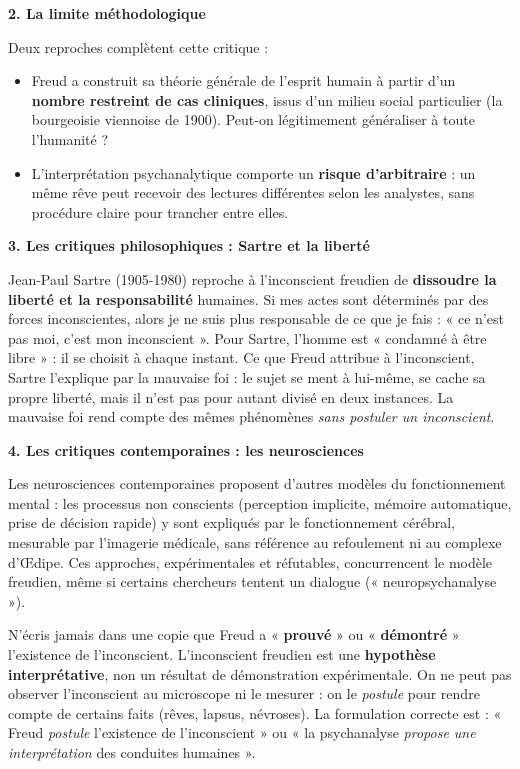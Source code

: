 \documentclass[11pt]{article}
\newcommand{\cle}[1]{{\popxbold\color{popdark}#1}}
\begin{document}
\textbf{2. La limite méthodologique}\par

Deux reproches complètent cette critique :
\begin{itemize}
\item Freud a construit sa théorie générale de l'esprit humain à partir d'un \textbf{nombre restreint de cas cliniques}, issus d'un milieu social particulier (la bourgeoisie viennoise de 1900). Peut-on légitimement généraliser à toute l'humanité ?
\item L'interprétation psychanalytique comporte un \textbf{risque d'arbitraire} : un même rêve peut recevoir des lectures différentes selon les analystes, sans procédure claire pour trancher entre elles.
\end{itemize}

\textbf{3. Les critiques philosophiques : Sartre et la liberté}\par

Jean-Paul \cle{Sartre} (1905-1980) reproche à l'inconscient freudien de \textbf{dissoudre la liberté et la responsabilité} humaines. Si mes actes sont déterminés par des forces inconscientes, alors je ne suis plus responsable de ce que je fais : « ce n'est pas moi, c'est mon inconscient ». Pour Sartre, l'homme est « condamné à être libre » : il se choisit à chaque instant. Ce que Freud attribue à l'inconscient, Sartre l'explique par la \cle{mauvaise foi} : le sujet se ment à lui-même, se cache sa propre liberté, mais il n'est pas pour autant divisé en deux instances. La mauvaise foi rend compte des mêmes phénomènes \emph{sans postuler un inconscient}.

\textbf{4. Les critiques contemporaines : les neurosciences}\par

Les \cle{neurosciences} contemporaines proposent d'autres modèles du fonctionnement mental : les processus non conscients (perception implicite, mémoire automatique, prise de décision rapide) y sont expliqués par le fonctionnement cérébral, mesurable par l'imagerie médicale, sans référence au refoulement ni au complexe d'{\OE}dipe. Ces approches, expérimentales et réfutables, concurrencent le modèle freudien, même si certains chercheurs tentent un dialogue (« neuropsychanalyse »).

\begin{attention}
N'écris jamais dans une copie que Freud a « \textbf{prouvé} » ou « \textbf{démontré} » l'existence de l'inconscient. L'inconscient freudien est une \textbf{hypothèse interprétative}, non un résultat de démonstration expérimentale. On ne peut pas observer l'inconscient au microscope ni le mesurer : on le \emph{postule} pour rendre compte de certains faits (rêves, lapsus, névroses). La formulation correcte est : « Freud \emph{postule} l'existence de l'inconscient » ou « la psychanalyse \emph{propose une interprétation} des conduites humaines ».
\end{attention}
\end{document}
